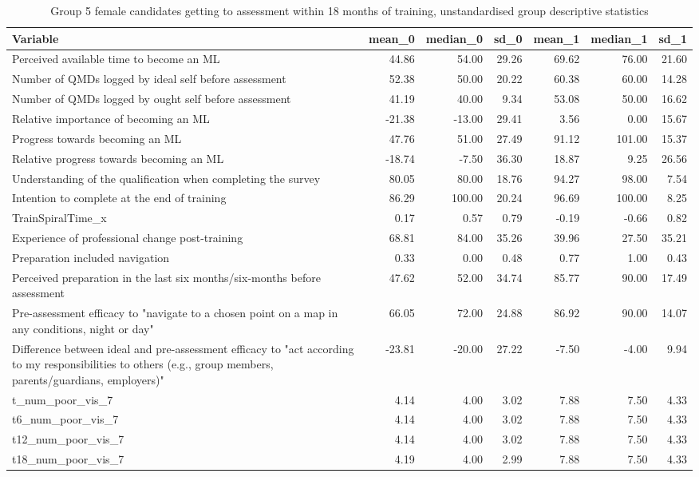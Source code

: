 \documentclass[a4paper,]{book}
\begin{document}
\begin{table}

\caption{\label{tab:female-GTA-18m-combined-summary-stats}Group 5 female candidates getting to assessment within 18 months of training, unstandardised group descriptive statistics}
\centering
\begin{tabular}[t]{lrrrrrr}
\toprule
Variable & mean\_0 & median\_0 & sd\_0 & mean\_1 & median\_1 & sd\_1\\
\midrule
Perceived available time to become an ML & 44.86 & 54.00 & 29.26 & 69.62 & 76.00 & 21.60\\
Number of QMDs logged by ideal self before assessment & 52.38 & 50.00 & 20.22 & 60.38 & 60.00 & 14.28\\
Number of QMDs logged by ought self before assessment & 41.19 & 40.00 & 9.34 & 53.08 & 50.00 & 16.62\\
Relative importance of becoming an ML & -21.38 & -13.00 & 29.41 & 3.56 & 0.00 & 15.67\\
Progress towards becoming an ML & 47.76 & 51.00 & 27.49 & 91.12 & 101.00 & 15.37\\
\addlinespace
Relative progress towards becoming an ML & -18.74 & -7.50 & 36.30 & 18.87 & 9.25 & 26.56\\
Understanding of the qualification when completing the survey & 80.05 & 80.00 & 18.76 & 94.27 & 98.00 & 7.54\\
Intention to complete at the end of training & 86.29 & 100.00 & 20.24 & 96.69 & 100.00 & 8.25\\
TrainSpiralTime\_x & 0.17 & 0.57 & 0.79 & -0.19 & -0.66 & 0.82\\
Experience of professional change post-training & 68.81 & 84.00 & 35.26 & 39.96 & 27.50 & 35.21\\
\addlinespace
Preparation included navigation & 0.33 & 0.00 & 0.48 & 0.77 & 1.00 & 0.43\\
Perceived preparation in the last six months/six-months before assessment & 47.62 & 52.00 & 34.74 & 85.77 & 90.00 & 17.49\\
Pre-assessment efficacy to "navigate to a chosen point on a map in any conditions, night or day" & 66.05 & 72.00 & 24.88 & 86.92 & 90.00 & 14.07\\
Difference between ideal and pre-assessment efficacy to "act according to my responsibilities to others (e.g., group members, parents/guardians, employers)" & -23.81 & -20.00 & 27.22 & -7.50 & -4.00 & 9.94\\
t\_num\_poor\_vis\_7 & 4.14 & 4.00 & 3.02 & 7.88 & 7.50 & 4.33\\
\addlinespace
t6\_num\_poor\_vis\_7 & 4.14 & 4.00 & 3.02 & 7.88 & 7.50 & 4.33\\
t12\_num\_poor\_vis\_7 & 4.14 & 4.00 & 3.02 & 7.88 & 7.50 & 4.33\\
t18\_num\_poor\_vis\_7 & 4.19 & 4.00 & 2.99 & 7.88 & 7.50 & 4.33\\
\bottomrule
\end{tabular}
\end{table}
\end{document}
